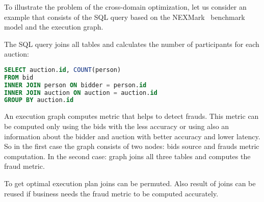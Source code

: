 To illustrate the problem of the cross-domain optimization, let us consider an example that consists of the SQL query based on the NEXMark~\cite{TODO} benchmark model and the execution graph.

The SQL query joins all tables and calculates the number of participants for each auction:
\begin{lstlisting}[language=SQL]
SELECT auction.id, COUNT(person)
FROM bid
INNER JOIN person ON bidder = person.id
INNER JOIN auction ON auction = auction.id
GROUP BY auction.id
\end{lstlisting}

An execution graph computes metric that helps to detect frauds.
This metric can be computed only using the bids with the less accuracy or using also an information about the bidder and auction with better accuracy and lower latency.
So in the first case the graph consists of two nodes: bids source and frauds metric computation.
In the second case: graph joins all three tables and computes the fraud metric.

To get optimal execution plan joins can be permuted.
Also result of joins can be reused if business needs the fraud metric to be computed accurately.
